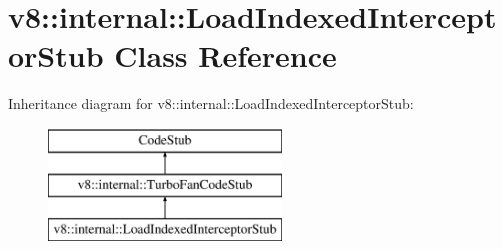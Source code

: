 \hypertarget{classv8_1_1internal_1_1_load_indexed_interceptor_stub}{}\section{v8\+:\+:internal\+:\+:Load\+Indexed\+Interceptor\+Stub Class Reference}
\label{classv8_1_1internal_1_1_load_indexed_interceptor_stub}
Inheritance diagram for v8\+:\+:internal\+:\+:Load\+Indexed\+Interceptor\+Stub\+:\begin{figure}[H]
\begin{center}
\leavevmode
\includegraphics[height=3.000000cm]{classv8_1_1internal_1_1_load_indexed_interceptor_stub}
\end{center}
\end{figure}
